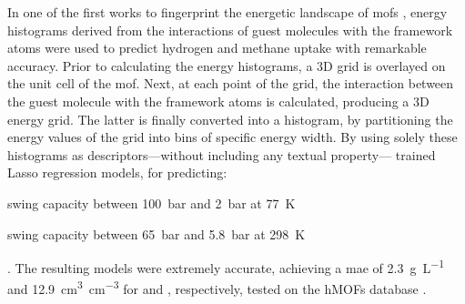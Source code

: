 In one of the first works to fingerprint the energetic landscape of \glspl{mof}
\parencite{bucior}, energy histograms derived from the
interactions of guest molecules with the framework atoms were used to predict
hydrogen and methane uptake with remarkable accuracy. Prior to calculating the
energy histograms, a 3D grid is overlayed on the unit cell of the \gls{mof}.
Next, at each point of the grid, the interaction between the guest molecule with
the framework atoms is calculated, producing a 3D energy grid. The latter is finally converted into a histogram, by partitioning the
energy values of the grid into bins of specific energy width. By using solely
these histograms as descriptors---without including any textual
property---\textcite{bucior} trained Lasso regression
models, for predicting:
\begin{enumerate*}[label=\roman*).]
	\item {} swing capacity between \SI{100}{\bar}
		and \SI{2}{\bar} at \SI{77}{\kelvin}
	\item {} swing capacity between \SI{65}{\bar}
		and \SI{5.8}{\bar} at \SI{298}{\kelvin}
\end{enumerate*}.
The resulting models were extremely accurate, achieving a \gls{mae} of \SI{2.3}{\gram\per\liter} and
\SI{12.9}{\cubic\centi\meter\per\cubic\centi\meter} for  and ,
respectively, tested on the hMOFs database
\parencite{siegel36}.


